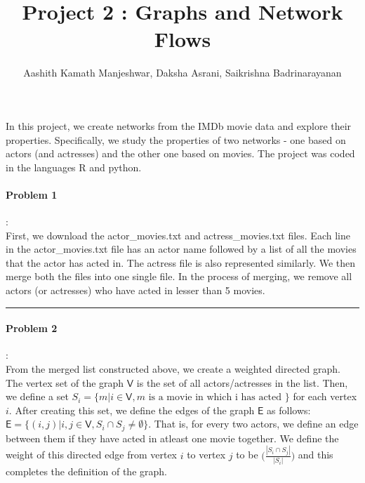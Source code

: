 \documentclass{article}
\title{Project 2 : Graphs and Network Flows}
\author{Aashith Kamath Manjeshwar, Daksha Asrani, Saikrishna Badrinarayanan}
\newcommand{\V}{\mathsf{V}}
\newcommand{\E}{\mathsf{E}}
\begin{document}
\maketitle

In this project, we create networks from the IMDb movie data and explore their properties. Specifically,
we study the properties of two networks - one based on actors (and actresses) and the other one based on movies. 
The project was coded in the languages R and python.

\paragraph{Problem 1}: \\
First, we download the actor\_movies.txt and actress\_movies.txt files. Each line in the actor\_movies.txt file has an actor
name followed by a list of all the movies that the actor has acted in. The actress file is also represented similarly.
We then merge both the files into one single file. In the process of merging, we remove all actors (or actresses) who have
acted in lesser than 5 movies.\\

\hrule

\paragraph{Problem 2}:\\
From the merged list constructed above, we create a weighted directed graph. The vertex set of the graph 
$\V$ is the set of all actors/actresses in the list. Then, we define a set 
$ S_i = \{m | i \in \V, m \mbox{ is a movie in which i has acted } \}$ for each vertex $i$. After 
creating this set, we define the edges of the graph $\E$ as follows:
$\E = \{(i,j) | i,j \in \V, S_i \cap S_j \neq \emptyset\}$. That is, for every two actors, we define an edge between them
if they have acted in atleast one movie together. We define the weight of this directed edge from vertex $i$ to
vertex $j$ to be $\Big(\frac{|S_i \cap S_j|}{|S_i|}\Big)$ and this completes
the definition of the graph. \\
\end{document}
